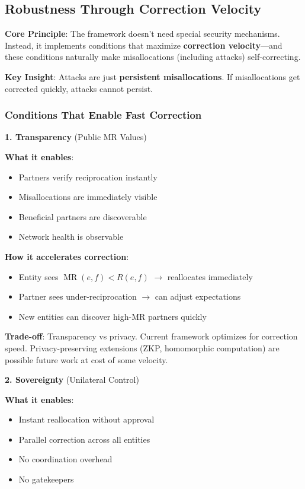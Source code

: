 \documentclass[11pt,a4paper]{article}
\theoremstyle{definition}
\theoremstyle{remark}
\DeclareMathOperator{\MR}{MR}
\begin{document}
\subsection{Robustness Through Correction Velocity}
\label{sec:robustness}

\textbf{Core Principle}: The framework doesn't need special security mechanisms. Instead, it implements conditions that maximize \textbf{correction velocity}---and these conditions naturally make misallocations (including attacks) self-correcting.

\textbf{Key Insight}: Attacks are just \textbf{persistent misallocations}. If misallocations get corrected quickly, attacks cannot persist.

\subsubsection{Conditions That Enable Fast Correction}

\textbf{1. Transparency} (Public MR Values)

\textbf{What it enables}:
\begin{itemize}
\item Partners verify reciprocation instantly
\item Misallocations are immediately visible
\item Beneficial partners are discoverable
\item Network health is observable
\end{itemize}

\textbf{How it accelerates correction}:
\begin{itemize}
\item Entity sees $\MR(e,f) < R(e,f)$ $\rightarrow$ reallocates immediately
\item Partner sees under-reciprocation $\rightarrow$ can adjust expectations
\item New entities can discover high-MR partners quickly
\end{itemize}

\textbf{Trade-off}: Transparency vs privacy. Current framework optimizes for correction speed. Privacy-preserving extensions (ZKP, homomorphic computation) are possible future work at cost of some velocity.

\textbf{2. Sovereignty} (Unilateral Control)

\textbf{What it enables}:
\begin{itemize}
\item Instant reallocation without approval
\item Parallel correction across all entities
\item No coordination overhead
\item No gatekeepers
\end{itemize}
\end{document}
